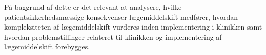På baggrund af dette er det relevant at analysere, hvilke patientsikkerhedsmæssige konsekvenser lægemiddelskift medfører, hvordan kompleksiteten af lægemiddelskift vurderes inden implementering i klinikken samt hvordan problemstillinger relateret til klinikken og implementering af lægemiddelskift forebygges. 
